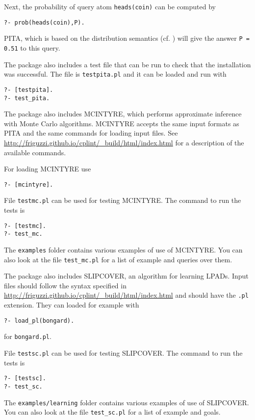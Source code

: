 Next, the probability of query atom \texttt{heads(coin)} can be
computed by
\begin{verbatim}
?- prob(heads(coin),P).
\end{verbatim} 
%
PITA, which is based on the distribution semantics
(cf. \cite{Sato95astatistical}) will give the answer {\tt P = 0.51} to
this query.  

The package also includes a test file that can be run to check that the installation was successful. 
The file is \texttt{testpita.pl} and it can be loaded and run with
\begin{verbatim}
?- [testpita].
?- test_pita.
\end{verbatim} 
The package also includes MCINTYRE, which performs approximate inference with Monte Carlo algorithms.
MCINTYRE accepts the same input formats as PITA and the same commands for loading input files.
See \url{http://friguzzi.github.io/cplint/_build/html/index.html} for a description of the available commands.

For loading MCINTYRE use
\begin{verbatim}
?- [mcintyre].
\end{verbatim} 

File \texttt{testmc.pl} can be used for testing MCINTYRE. The command to run the tests is
\begin{verbatim}
?- [testmc].
?- test_mc.
\end{verbatim} 
The \texttt{examples} folder contains various examples of use of MCINTYRE. You can 
also look at the file \texttt{test\_mc.pl} for a list of example and queries over them.

The package also includes SLIPCOVER, an algorithm for learning LPADs. Input files should 
follow the syntax specified in \url{http://friguzzi.github.io/cplint/_build/html/index.html} and should have the
\texttt{.pl} extension. They can loaded for example with
\begin{verbatim}
?- load_pl(bongard).
\end{verbatim}
for \texttt{bongard.pl}.

File \texttt{testsc.pl} can be used for testing SLIPCOVER. The command to run the tests is
\begin{verbatim}
?- [testsc].
?- test_sc.
\end{verbatim} 
The \texttt{examples/learning} folder contains various examples of use of SLIPCOVER. You can 
also look at the file \texttt{test\_sc.pl} for a list of example and goals.



